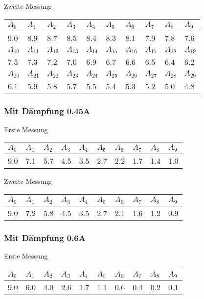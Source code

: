 \documentclass[12pt,a4paper]{article}
\begin{document}
\vspace{10pt}
Zweite Messung

\vspace{3pt}
\begin{tabular}{|l|l|l|l|l|l|l|l|l|l|}
\hline
$A_{0}$&$A_{1}$&$A_{2}$&$A_{3}$&$A_{4}$&$A_{5}$&$A_{6}$&$A_{7}$&$A_{8}$&$A_{9}$\\
\hline
9.0&8.9&8.7&8.5&8.4&8.3&8.1&7.9&7.8&7.6\\
\hline
\hline
$A_{10}$&$A_{11}$&$A_{12}$&$A_{13}$&$A_{14}$&$A_{15}$&$A_{16}$&$A_{17}$&$A_{18}$&$A_{19}$\\
\hline
7.5&7.3&7.2&7.0&6.9&6.7&6.6&6.5&6.4&6.2\\
\hline
\hline
$A_{20}$&$A_{21}$&$A_{22}$&$A_{23}$&$A_{24}$&$A_{25}$&$A_{26}$&$A_{27}$&$A_{28}$&$A_{29}$\\
\hline
6.1&5.9&5.8&5.7&5.5&5.4&5.3&5.2&5.0&4.8\\
\hline
\end{tabular}

\subsubsection*{Mit D\"ampfung 0.45A}
Erste Messung

\vspace{3pt}
\begin{tabular}{|l|l|l|l|l|l|l|l|l|l|}
\hline
$A_{0}$&$A_{1}$&$A_{2}$&$A_{3}$&$A_{4}$&$A_{5}$&$A_{6}$&$A_{7}$&$A_{8}$&$A_{9}$\\
\hline
9.0&7.1&5.7&4.5&3.5&2.7&2.2&1.7&1.4&1.0\\
\hline
\end{tabular}
\vspace{10pt}

Zweite Messung

\vspace{3pt}
\begin{tabular}{|l|l|l|l|l|l|l|l|l|l|}
\hline
$A_{0}$&$A_{1}$&$A_{2}$&$A_{3}$&$A_{4}$&$A_{5}$&$A_{6}$&$A_{7}$&$A_{8}$&$A_{9}$\\
\hline
9.0&7.2&5.8&4.5&3.5&2.7&2.1&1.6&1.2&0.9\\
\hline
\end{tabular}

\subsubsection*{Mit D\"ampfung 0.6A}
Erste Messung

\begin{tabular}{|l|l|l|l|l|l|l|l|l|l|}
\hline
$A_{0}$&$A_{1}$&$A_{2}$&$A_{3}$&$A_{4}$&$A_{5}$&$A_{6}$&$A_{7}$&$A_{8}$&$A_{9}$\\
\hline
9.0&6.0&4.0&2.6&1.7&1.1&0.6&0.4&0.2&0.1\\
\hline
\end{tabular}
\vspace{10pt}
\end{document}

